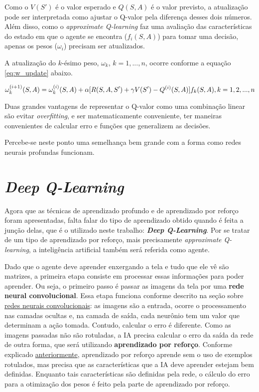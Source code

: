 Como o $V(S')$ é o valor esperado e $Q(S,A)$ é o valor previsto, a atualização pode ser interpretada como ajustar o Q-valor pela diferença desses dois números.
Além disso, como o \textit{approximate Q-learning} faz uma avaliação das características do estado em que o agente se encontra ($f_{i}(S,A)$) para tomar uma decisão, apenas os pesos ($\omega_{i}$) precisam ser atualizados.

A atualização do $k$-ésimo peso, $\omega_{k}$, $k = 1, ..., n$, ocorre conforme a equação \ref{eq:w_update} abaixo.

\begin{equation} \label{eq:w_update}
\omega_{k}^{(i+1)}(S,A) = \omega_{k}^{(i)}(S,A) + \alpha[R(S,A,S') + \gamma V(S') - Q^{(i)}(S,A)]f_{k}(S,A), \hfill k = 1, 2, ..., n
\end{equation}

Duas grandes vantagens de representar o Q-valor como uma combinação linear são evitar \textit{overfitting}, e ser matematicamente conveniente, ter maneiras convenientes de calcular erro e funções que generalizem as decisões.

Percebe-se neste ponto uma semelhança bem grande com a forma como redes neurais profundas funcionam.


\section{\textit{Deep Q-Learning}}
\label{sec:dql}

Agora que as técnicas de aprendizado profundo e de aprendizado por reforço foram apresentadas, falta falar do tipo de aprendizado obtido quando é feita a junção delas, que é o utilizado neste trabalho: \textit{\textbf{Deep Q-Learning}}.
Por se tratar de um tipo de aprendizado por reforço, mais precisamente \textit{approximate Q-learning}, a inteligência artificial também será referida como agente.

Dado que o agente deve aprender enxergando a tela e tudo que ele vê são matrizes, a primeira etapa consiste em processar essas informações para poder aprender.
Ou seja, o primeiro passo é passar as imagens da tela por uma \textbf{rede neural convolucional}.
Essa etapa funciona conforme descrito na seção sobre \hyperref[sec:cnn]{redes neurais convolucionais}: as imagens são a entrada, ocorre o processamento nas camadas ocultas e, na camada de saída, cada neurônio tem um valor que determinam a ação tomada.
Contudo, calcular o erro é diferente.
Como as imagens passadas não são rotuladas, a IA precisa calcular o erro da saída da rede de outra forma, que será utilizando \textbf{aprendizado por reforço}.
Conforme explicado \hyperref[sec:rl]{anteriormente}, aprendizado por reforço aprende sem o uso de exemplos rotulados, mas precisa que as características que a IA deve aprender estejam bem definidas.
Enquanto tais características são definidas pela rede, o cálculo do erro para a otimização dos pesos é feito pela parte de aprendizado por reforço.

